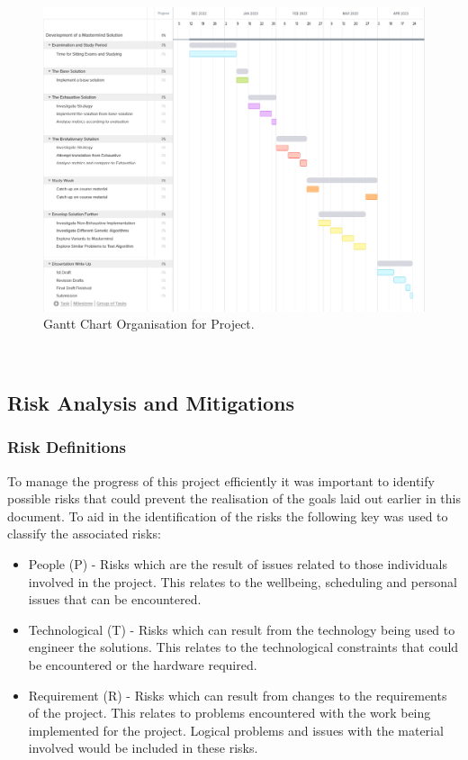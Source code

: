 \documentclass[11pt]{article}  %
\theoremstyle{definition}
\theoremstyle{remark}
\begin{document}
\

\begin{figure}[H]
\centering
\caption[Short Heading]{Gantt Chart Organisation for Project.}
\includegraphics[scale=0.5]{Gantt}
\end{figure}

\

\subsection {Risk Analysis and Mitigations}

\subsubsection {Risk Definitions}
To manage the progress of this project efficiently it was important to identify possible risks that could prevent the realisation of the goals laid out earlier in this document. To aid in the identification of the risks the following key was used to classify the associated risks:
\begin{itemize}
\item{People (P) - Risks which are the result of issues related to those individuals involved in the project. This relates to the wellbeing, scheduling and personal issues that can be encountered.}
\item{Technological (T) - Risks which can result from the technology being used to engineer the solutions. This relates to the technological constraints that could be encountered or the hardware required.}
\item{Requirement (R)  - Risks which can result from changes to the requirements of the project. This relates to problems encountered with the work being implemented for the project. Logical problems and issues with the material involved would be included in these risks.}
\end{itemize}
\end{document}
